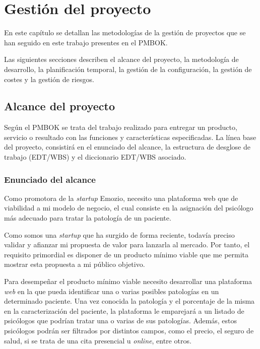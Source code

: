 \chapter{Gestión del proyecto}

En este capítulo se detallan las metodologías de la gestión de proyectos que se han seguido en este trabajo presentes en el PMBOK\cite{pmbok}.


Las siguientes secciones describen el alcance del proyecto, la metodología de desarrollo, la planificación temporal, la gestión de la configuración, la gestión de costes y la gestión de riesgos.


\section{Alcance del proyecto}

Según el PMBOK\cite{pmbok} se trata del trabajo realizado para entregar un producto, servicio o resultado con las funciones y características especificadas. La línea base del proyecto, consistirá en el enunciado del alcance, la estructura de desglose de trabajo (EDT/WBS) y el diccionario EDT/WBS asociado.

\subsection{Enunciado del alcance}
Como promotora de la \textit{startup} Emozio, necesito una plataforma web que de viabilidad a mi modelo de negocio, el cual consiste en la asignación del psicólogo más adecuado para tratar la patología de un paciente. 


Como somos una \textit{startup} que ha surgido de forma reciente, todavía preciso validar y afianzar mi propuesta de valor para lanzarla al mercado. Por tanto, el requisito primordial es disponer de un producto mínimo viable que me permita mostrar esta propuesta a mi público objetivo.


Para desempeñar el producto mínimo viable necesito desarrollar una plataforma \textit{web} en la que pueda identificar una o varias posibles patologías en un determinado paciente. Una vez conocida la patología y el porcentaje de la misma en la caracterización del paciente, la plataforma le emparejará a un listado de psicólogos que podrían tratar una o varias de sus  patologías. Además, estos psicólogos podrán ser filtrados por distintos campos, como el precio, el seguro de salud, si se trata de una cita presencial u \textit{online}, entre otros. 


